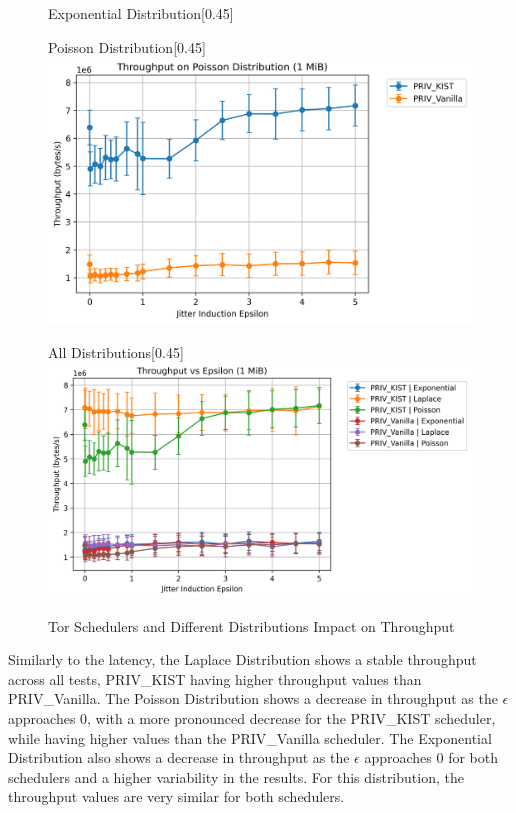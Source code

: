 \begin{figure}[htbp]
\begin{subcaptionbox}{Exponential Distribution\label{fig:jitter_throughput_exponential}}[0.45\textwidth]
    \end{subcaptionbox}
    \hfill
    \begin{subcaptionbox}{Poisson Distribution\label{fig:jitter_throughput_poisson}}[0.45\textwidth]
        {\includegraphics[width=\linewidth]{Chapters/Figures/Plots/Jitter/throughput_jitter_Poisson_1_mib.png}}
    \end{subcaptionbox}
    \hfill
    \begin{subcaptionbox}{All Distributions\label{fig:jitter_throughput_all}}[0.45\textwidth]
        {\includegraphics[width=\linewidth]{Chapters/Figures/Plots/Jitter/throughput_jitter_1_mib.png}}
    \end{subcaptionbox}
    \caption{Tor Schedulers and Different Distributions Impact on Throughput}\label{fig:jitter_throughput_analysis}
\end{figure}

Similarly to the latency, the Laplace Distribution shows a stable throughput across all tests, PRIV\_KIST having higher throughput values than PRIV\_Vanilla. The Poisson Distribution shows a decrease in throughput as the $\epsilon$ approaches 0, with a more pronounced decrease for the PRIV\_KIST scheduler, while having higher values than the PRIV\_Vanilla scheduler. The Exponential Distribution also shows a decrease in throughput as the $\epsilon$ approaches 0 for both schedulers and a higher variability in the results. For this distribution, the throughput values are very similar for both schedulers.

